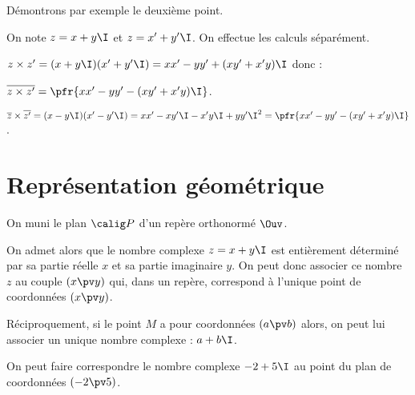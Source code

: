 \documentclass[10pt,openright,twoside,french]{book}
\begin{document}
\begin{Demo}
    Démontrons par exemple le deuxième point.\par
    On note $z = x + y\I$ et $z=x' + y'\I$. On effectue les calculs séparément.\par
    $z \times z' = (x + y\I)(x' + y'\I) = xx' - yy' + (xy' + x'y)\I$ donc :\par
    $\overline{z \times z'} = \pfr{xx' - yy' - (xy' + x'y)\I}$.\par\medskip
    $\overline z \times \overline{z'} = (x - y\I)(x' - y'\I) = xx' - xy'\I - x'y\I + yy'\I^2 = \pfr{xx' - yy' - (xy' + x'y)\I}$.
\end{Demo}

\section{Représentation géométrique}

On muni le plan $\calig P$ d'un repère orthonormé $\Ouv$.\par
On admet alors que le nombre complexe $z = x + y\I$ est entièrement déterminé par sa partie réelle $x$ et sa partie imaginaire $y$. On peut donc associer ce nombre $z$ au couple $(x \pv y)$ qui, dans un repère, correspond à l'unique point de coordonnées $(x \pv y)$.\par
Réciproquement, si le point $M$ a pour coordonnées $(a \pv b)$ alors, on peut lui associer un unique nombre complexe : $a + b\I$.\medskip

\begin{Exemple}
    On peut faire correspondre le nombre complexe $-2 + 5\I$ au point du plan de coordonnées $(-2 \pv 5)$.
    \begin{center}
    \end{center}
\end{Exemple}
\end{document}
